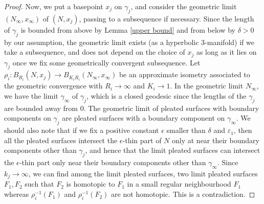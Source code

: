 \documentclass{amsart}
\theoremstyle{definition}
\numberwithin{figure}{section}
\numberwithin{equation}{section}
\begin{document}
\begin{proof}
Now, we put a basepoint $x_j$ on $\gamma_j$, and consider the geometric limit $(N_\infty, x_\infty)$ of $(N, x_j)$, passing to a subsequence if necessary.
Since the length of $\gamma_j$ is bounded from above by Lemma \ref{upper bound} and from below by $\delta>0$ by our assumption,  the geometric limit exists (as a hyperbolic $3$-manifold) if we take a subsequence, and does not depend on the choice of $x_j$ as long as it lies on $\gamma_j$ once we fix some geometrically convergent subsequence.
Let $\rho_i : B_{R_i}(N, x_j) \rightarrow B_{K_i R_i}(N_\infty, x_\infty)$ be an approximate isometry associated to the geometric convergence with $R_i \rightarrow \infty$ and $K_i \rightarrow 1$.
In the geometric limit $N_\infty$, we have  the limit $\gamma_\infty$ of $\gamma_j$, which is a closed geodesic since  the lengths of the $\gamma_j$ are bounded away from $0$.
The geometric limit of pleated surfaces with boundary components on $\gamma_j$ are pleated surfaces with a boundary component on $\gamma_\infty$.
We should also note that if we fix a positive constant $\epsilon$ smaller than $\delta$ and $\varepsilon_1$, then  all the pleated surfaces intersect the $\epsilon$-thin part of $N$  only at near their boundary components other than $\gamma_j$, and hence that the limit pleated surfaces can intersect the $\epsilon$-thin part only near their boundary components other than $\gamma_\infty$.
Since $k_j \rightarrow \infty$, we can find among the limit pleated surfaces,  two limit pleated surfaces $F_1, F_2$ such that $F_2$ is homotopic to $F_1$ in a small regular neighbourhood $F_1$ whereas $\rho_i^{-1}(F_1)$ and $\rho_i^{-1}(F_2)$ are not homotopic.
This is a contradiction.


\end{proof}
\end{document}
